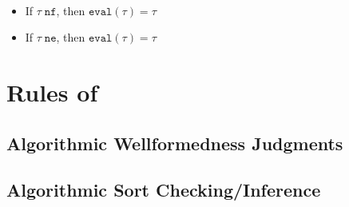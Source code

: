 \idxsubsteval*


\normthm*


\begin{theorem}
~\begin{itemize}
  \item If $\tau \; \texttt{nf}$, then $\texttt{eval}(\tau) = \tau$
  \item If $\tau \; \texttt{ne}$, then $\texttt{eval}(\tau) = \tau$
\end{itemize}
\label{thm:norm-idemp}
\end{theorem}

\section{Rules of \bilambdaamor}

\subsection{Algorithmic Wellformedness Judgments}
\begin{mathpar}



\end{mathpar}

\subsection{Algorithmic Sort Checking/Inference}

